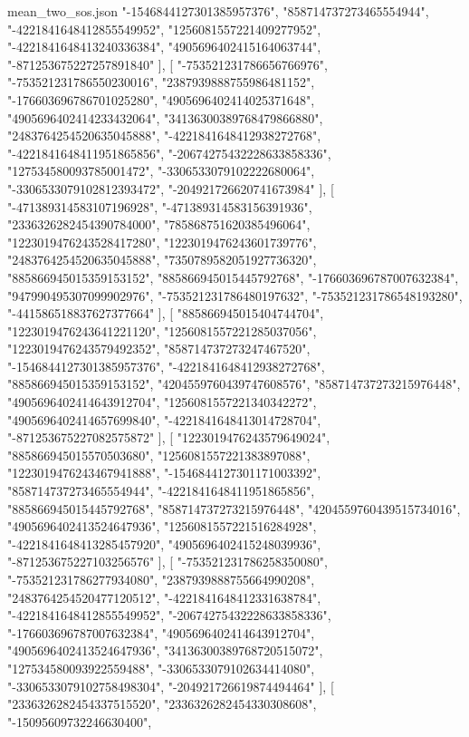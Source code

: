 \begin{filecontents*}[overwrite]{mean_two_sos.json}
    "-1546844127301385957376",
    "858714737273465554944",
    "-4221841648412855549952",
    "1256081557221409277952",
    "-4221841648413240336384",
    "4905696402415164063744",
    "-871253675227257891840"
   ],
   [
    "-753521231786656766976",
    "-753521231786550230016",
    "2387939888755986481152",
    "-176603696786701025280",
    "4905696402414025371648",
    "4905696402414233432064",
    "34136300389768479866880",
    "2483764254520635045888",
    "-4221841648412938272768",
    "-4221841648411951865856",
    "-20674275432228633858336",
    "127534580093785001472",
    "-3306533079102222680064",
    "-3306533079102812393472",
    "-204921726620741673984"
   ],
   [
    "-471389314583107196928",
    "-471389314583156391936",
    "2336326282454390784000",
    "785868751620385496064",
    "1223019476243528417280",
    "1223019476243601739776",
    "2483764254520635045888",
    "7350789582051927736320",
    "885866945015359153152",
    "885866945015445792768",
    "-176603696787007632384",
    "947990495307099902976",
    "-753521231786480197632",
    "-753521231786548193280",
    "-441586518837627377664"
   ],
   [
    "885866945015404744704",
    "1223019476243641221120",
    "1256081557221285037056",
    "1223019476243579492352",
    "858714737273247467520",
    "-1546844127301385957376",
    "-4221841648412938272768",
    "885866945015359153152",
    "4204559760439747608576",
    "858714737273215976448",
    "4905696402414643912704",
    "1256081557221340342272",
    "4905696402414657699840",
    "-4221841648413014728704",
    "-871253675227082575872"
   ],
   [
    "1223019476243579649024",
    "885866945015570503680",
    "1256081557221383897088",
    "1223019476243467941888",
    "-1546844127301171003392",
    "858714737273465554944",
    "-4221841648411951865856",
    "885866945015445792768",
    "858714737273215976448",
    "4204559760439515734016",
    "4905696402413524647936",
    "1256081557221516284928",
    "-4221841648413285457920",
    "4905696402415248039936",
    "-871253675227103256576"
   ],
   [
    "-753521231786258350080",
    "-753521231786277934080",
    "2387939888755664990208",
    "2483764254520477120512",
    "-4221841648412331638784",
    "-4221841648412855549952",
    "-20674275432228633858336",
    "-176603696787007632384",
    "4905696402414643912704",
    "4905696402413524647936",
    "34136300389768720515072",
    "127534580093922559488",
    "-3306533079102634414080",
    "-3306533079102758498304",
    "-204921726619874494464"
   ],
   [
    "2336326282454337515520",
    "2336326282454330308608",
    "-15095609732246630400",

\end{filecontents*}

